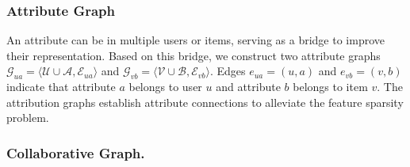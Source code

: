 \subsubsection{Attribute Graph} 
An attribute can be in multiple users or items, serving as a bridge to improve their representation.
Based on this bridge, we construct two attribute graphs $\mathcal{G}_{ua}=\langle \mathcal{U}\cup\mathcal{A},  \mathcal{E}_{ua}\rangle$ and $\mathcal{G}_{vb}=\langle \mathcal{V}\cup\mathcal{B}, \mathcal{E}_{vb}\rangle$.
Edges $e_{ua}=(u,a)$ and $e_{vb}=(v,b)$ indicate that attribute $a$ belongs to user $u$ and attribute $b$ belongs to item $v$.
The attribution graphs establish attribute connections to alleviate the feature sparsity problem. 
\subsubsection{Collaborative Graph.}

